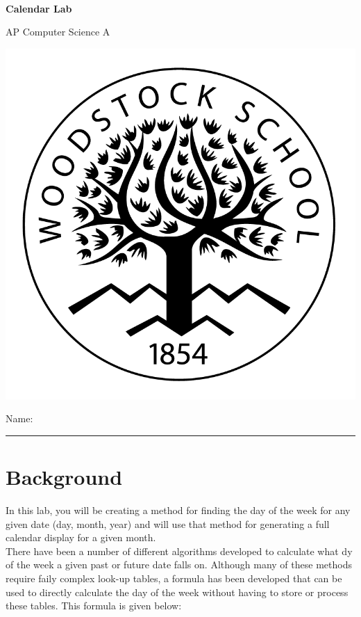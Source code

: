 

\def\LabCourse{AP Computer Science A}
\def\LabNumber{01}
\def\LabTitle{Calendar Lab}


	\begin{coverpages}
		\ \\[2cm]
		\begin{center}
			\huge
			\textbf{\LabTitle}

			\Large
			\LabCourse
		\end{center}

		\vspace{1.5cm}

		\begin{center}
			\includegraphics[scale=0.45]{graphics/logo_black}

			\vspace{2.5cm}

			\Large
			Name: \rule{11.5cm}{0.1pt}
		\end{center}
	\end{coverpages}

	\blankpage

	\thispagestyle{empty}
	\tableofcontents

	\pagebreak

	\section{Background}
		In this lab, you will be creating a method for finding the day of the week for any given date (day, month, year) and will use that method for generating a full calendar display for a given month.\\[\baselineskip]
		There have been a number of different algorithms developed to calculate what dy of the week a given past or future date falls on. Although many of these methods require faily complex look-up tables, a formula has been developed that can be used to directly calculate the day of the week without having to store or process these tables. This formula is given below:
	
